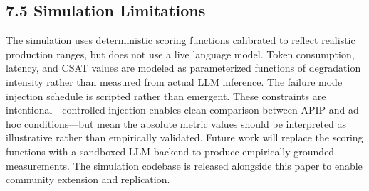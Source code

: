 \subsection{7.5  Simulation Limitations}

The simulation uses deterministic scoring functions calibrated to reflect realistic production ranges, but does not use a live language model. Token consumption, latency, and CSAT values are modeled as parameterized functions of degradation intensity rather than measured from actual LLM inference. The failure mode injection schedule is scripted rather than emergent. These constraints are intentional---controlled injection enables clean comparison between APIP and ad-hoc conditions---but mean the absolute metric values should be interpreted as illustrative rather than empirically validated. Future work will replace the scoring functions with a sandboxed LLM backend to produce empirically grounded measurements. The simulation codebase is released alongside this paper to enable community extension and replication.

